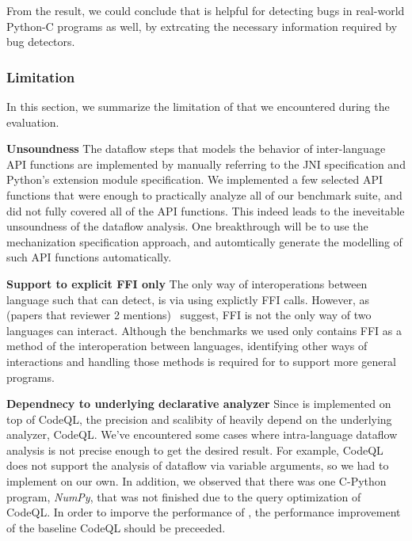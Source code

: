 {From the result, we could conclude that \ours is helpful for detecting bugs in
real-world Python-C programs as well, by extrcating the necessary information
required by bug detectors.

\subsubsection{Limitation}
In this section, we summarize the limitation of \ours that we encountered during the evaluation.

\textbf{Unsoundness} The dataflow steps that models the behavior of inter-language API functions
are implemented by manually referring to the JNI specification and Python's extension module specification.
We implemented a few selected API functions that were enough to practically analyze
all of our benchmark suite, and did not fully covered all of the API functions.
This indeed leads to the ineveitable unsoundness of the dataflow analysis.
One breakthrough will be to use the mechanization specification approach, and
automtically generate the modelling of such API functions automatically.

\textbf{Support to explicit FFI only}
The only way of interoperations between language such that \ours can detect, is via
using explictly FFI calls. However, as (papers that reviewer 2 mentions)~\cite{reviewr2} suggest,
FFI is not the only way of two languages can interact.
Although the benchmarks we used only contains FFI as a method of the interoperation between languages,
identifying other ways of interactions and handling those methods is required for \ours to support more general programs.

\textbf{Dependnecy to underlying declarative analyzer}
Since \ours is implemented on top of CodeQL, the precision and scalibity of \ours heavily depend on the
underlying analyzer, CodeQL. We've encountered some cases where intra-language dataflow analysis is
not precise enough to get the desired result. For example, CodeQL does not support the
analysis of dataflow via variable arguments, so we had to implement on our own.
In addition, we observed that there was one C-Python program, {\it NumPy}, that was not finished
due to the query optimization of CodeQL. 
In order to imporve the performance of \ours, the performance improvement of the
baseline CodeQL should be preceeded.
}